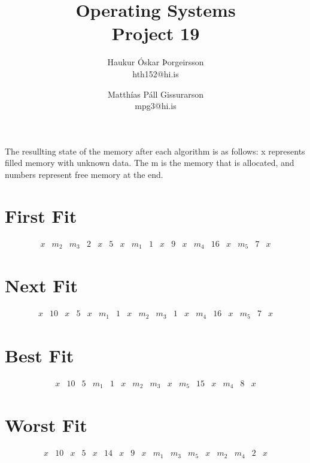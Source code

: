 \documentclass[a4]{article}
\title{Operating Systems\\
Project 19}
\author{           
    Haukur Óskar Þorgeirsson\\
    hth152@hi.is \and
    Matthías Páll Gissurarson\\
    mpg3@hi.is
}
\begin{document}
\maketitle

The resullting state of the memory after each algorithm is as follows:
x represents filled memory with unknown data. The m is the memory that is allocated, and numbers represent free memory at the end.
\section{First Fit}
$$
\begin{array}{|l|l|l|l|l|l|l|l|l|l|l|l|l|l|l|l|l|l|}
x & m_2 & m_3 & 2 & x & 5 & x & m_1 & 1 & x & 9 & x & m_4 & 16 & x & m_5 & 7 & x 
\end{array}
$$
\section{Next Fit}

$$
\begin{array}{|l|l|l|l|l|l|l|l|l|l|l|l|l|l|l|l|l|l|}
x & 10 & x & 5 & x & m_1 & 1 & x & m_2 & m_3 & 1 & x & m_4 & 16 & x & m_5 & 7 & x 
\end{array}
$$

\section{Best Fit}

$$
\begin{array}{|l|l|l|l|l|l|l|l|l|l|l|l|l|l|l|}
x & 10 & 5 & m_1 & 1 & x & m_2 & m_3 & x & m_5 & 15 & x & m_4 & 8 & x
\end{array}
$$

\section{Worst Fit}
$$
\begin{array}{|l|l|l|l|l|l|l|l|l|l|l|l|l|l|l|l|l|}
x & 10 & x & 5 & x & 14 & x & 9 & x & m_1 & m_3 & m_5 & x & m_2 & m_4 & 2 & x 
\end{array}
$$
\end{document}
